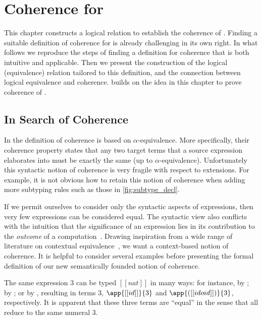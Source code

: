 
\chapter{Coherence for \namee}
\label{chap:coherence:simple}

This chapter constructs a logical relation to
establish the coherence of \namee. Finding a
suitable definition of coherence for \namee is already challenging in its own
right. In what follows we reproduce the steps of finding a definition for coherence
that is both intuitive and applicable. Then we present the
construction of the logical (equivalence) relation tailored to this
definition, and the connection between logical equivalence and coherence.
 builds on the idea in this chapter to prove coherence of
\fnamee.


\section{In Search of Coherence}

In \oname the definition of coherence is based on
$\alpha$-equivalence. More specifically, their coherence property states that
any two target terms that a source expression elaborates into must be exactly the same (up to
$\alpha$-equivalence). Unfortunately this syntactic notion of coherence is
very fragile with respect to extensions.
For example, it is not obvious how to retain this notion of coherence when adding more subtyping
rules such as those in \cref{fig:subtype_decl}.

If we permit ourselves to consider only the syntactic aspects of expressions,
then very few expressions can be considered equal. The syntactic view also conflicts
with the intuition that the significance of an expression lies in its
contribution to the \textit{outcome} of a computation~\cite{Harper_2016}.
Drawing inspiration from a wide range of literature on contextual
equivalence~\cite{morris1969lambda}, we want a context-based notion of
coherence. It is helpful to consider several examples before presenting the
formal definition of our new semantically founded notion of coherence.

\begin{example} \label{eg:1}
The same \namee expression $3$ can be typed $[[nat]]$ in many ways: for instance, by ; by
; or by , resulting in \tname
terms $3$, $\app{[[id]]}{3}$ and $\app{([[id o id]])}{3}$, respectively. It is apparent
that these three \tname terms are ``equal'' in the sense that all reduce to the
same numeral $3$.
\end{example}

